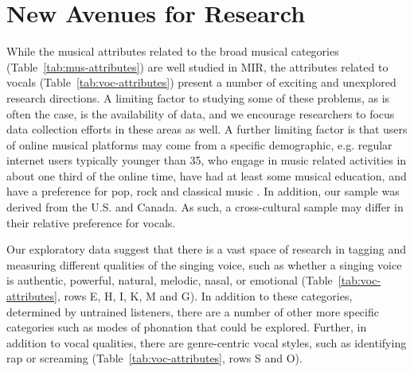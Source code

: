 \documentclass{article}
\begin{document}
\section{New Avenues for Research}
While the musical attributes related to the broad musical categories (Table~\ref{tab:mus-attributes}) are well studied in MIR, the attributes related to vocals (Table~\ref{tab:voc-attributes}) present a number of exciting and unexplored research directions.
A limiting factor to studying some of these problems, as is often the case, is the availability of data, and we encourage researchers to focus data collection efforts in these areas as well. A further limiting factor is that users of online musical platforms may come from a specific demographic, e.g. regular internet users typically younger than 35, who engage in music related activities in about one third of the online time, have had at least some musical education, and have a preference for pop, rock and classical music \cite{lesaffre2008potential}. In addition, our sample was derived from the U.S. and Canada. As such, a cross-cultural sample may differ in their relative preference for vocals.


Our exploratory data suggest that there is a vast space of research in tagging and measuring different qualities of the singing voice, such as whether a singing voice is authentic, powerful, natural, melodic, nasal, or emotional (Table~\ref{tab:voc-attributes}, rows E, H, I, K, M and G).
In addition to these categories, determined by untrained listeners, there are a number of other more specific categories such as modes of phonation that could be explored. %
Further, in addition to vocal qualities, there are genre-centric vocal styles, such as identifying rap or screaming (Table~\ref{tab:voc-attributes}, rows S and O).
\end{document}
